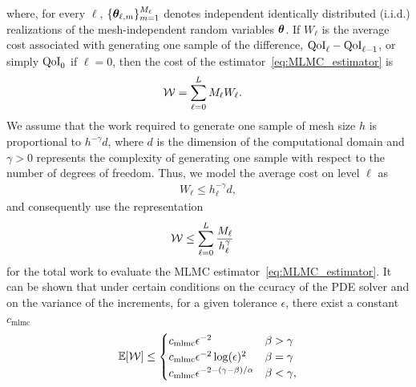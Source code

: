 where, for every $\ell$,  $\{\bm{\theta}_{\ell,m}\}_{m=1}^{M_\ell}$
denotes independent identically distributed (i.i.d.) realizations of the mesh-independent random variables $\bm{\theta}$. If $W_\ell$ is the average cost associated with generating one sample of the difference, $\text{QoI}_{\ell}-\text{QoI}_{\ell-1}$, or simply $\text{QoI}_0$ if $\ell=0$, then the cost of the
estimator~\eqref{eq:MLMC_estimator} is
\begin{align}
\label{eq:work_sum}
\mathcal{W} & = \sum_{\ell=0}^{L} M_\ell W_\ell.
\end{align}
%
We assume that the work required to generate one sample of mesh size
$h$ is proportional to $h^{-\gamma}d$, where $d$ is the dimension of the
computational domain and $\gamma > 0$ represents the complexity of
generating one sample with respect to the number of degrees of freedom.
Thus, we model the average cost on level $\ell$ as
\begin{align}
\label{eq:wl_model}
W_\ell \leq h_\ell^{-\gamma}d,
\end{align}
and consequently use the representation
\begin{align}
\label{eq:model_work}
\mathcal{W} & \leq \sum_{\ell=0}^{L} \frac{M_\ell}{h_\ell^{\gamma}}
\end{align}
for the total work to evaluate the MLMC estimator~\eqref{eq:MLMC_estimator}.
It can be shown that under certain conditions on the ccuracy of the PDE solver and on the variance of the increments, for a given tolerance $\epsilon$, there exist a constant $c_\text{mlmc}$ \begin{align}\label{mlmc_cost}
\mathbb{E}[\mathcal{W}]\leq\begin{cases}
c_\text{mlmc}\epsilon ^{-2}& \beta>\gamma \\
c_\text{mlmc}\epsilon ^{-2}\log(\epsilon)^2& \beta=\gamma \\
c_\text{mlmc}\epsilon ^{-2-(\gamma-\beta)/\alpha}& \beta<\gamma, \\
\end{cases}
\end{align}
